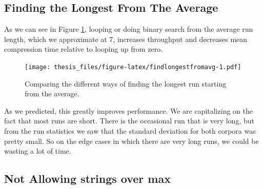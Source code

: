 \documentclass[12pt,twoside]{reedthesis}
\begin{document}
\hypertarget{finding-the-longest-from-the-average}{%
\subsection{Finding the Longest From The Average}\label{finding-the-longest-from-the-average}}

As we can see in Figure \ref{fig:findlongestfromavg}, looping or doing binary search from the average run length, which we approximate at 7, increases throughput and decreases mean compression time relative to looping up from zero.
\begin{figure}
\centering
\texttt{[image: thesis\_files/figure-latex/findlongestfromavg-1.pdf]}
\caption{\label{fig:findlongestfromavg}Comparing the different ways of finding the longest run starting from the average.}
\end{figure}
As we predicted, this greatly improves performance. We are capitalizing on the fact that most runs are short. There is the occasional run that is very long, but from the run statistics we saw that the standard deviation for both corpora was pretty small. So on the edge cases in which there are very long runs, we could be wasting a lot of time.

\hypertarget{not-allowing-strings-over-max}{%
\subsection{Not Allowing strings over max}\label{not-allowing-strings-over-max}}
\end{document}
